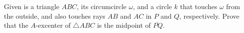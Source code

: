 Given is a triangle $ABC$, its circumcircle $\omega$, and a circle $k$ that touches $\omega$ from the outside, and also touches rays $AB$ and $AC$ in $P$ and $Q$, respectively. Prove that the $A$-excenter of $\triangle ABC$ is the midpoint of $\overline{PQ}$.